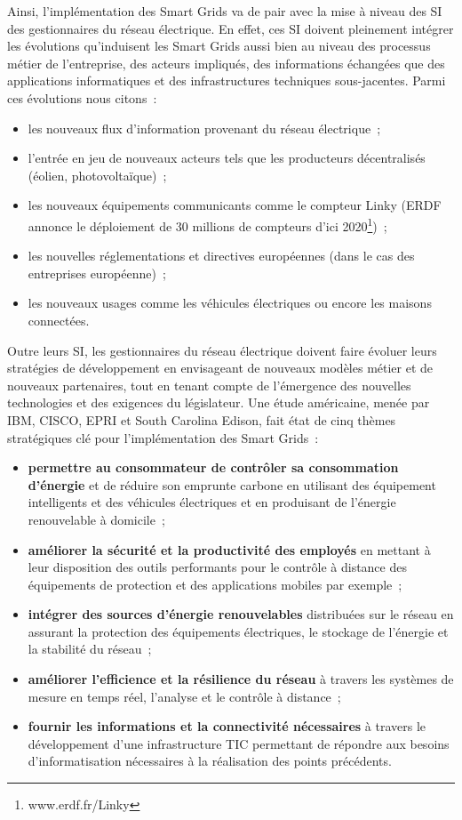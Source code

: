 Ainsi, l'implémentation des Smart Grids va de pair avec la mise à niveau des SI des gestionnaires du réseau électrique. En effet, ces SI doivent pleinement intégrer les évolutions qu'induisent les Smart Grids aussi bien au niveau des processus métier de l'entreprise, des acteurs impliqués, des informations échangées que des applications informatiques et des infrastructures techniques sous-jacentes. Parmi ces évolutions nous citons~:
\begin{itemize}
\item les nouveaux flux d'information provenant du réseau électrique~;
\item l'entrée en jeu de nouveaux acteurs tels que les producteurs décentralisés (éolien, photovoltaïque)~;
\item les nouveaux équipements communicants comme le compteur Linky (ERDF annonce le déploiement de 30 millions de compteurs d'ici 2020\footnote{www.erdf.fr/Linky})~;
\item les nouvelles réglementations et directives européennes (dans le cas des entreprises européenne)~;
\item les nouveaux usages comme les véhicules électriques ou encore les maisons connectées.
\end{itemize}

Outre leurs SI, les gestionnaires du réseau électrique doivent faire évoluer leurs stratégies de développement en envisageant de nouveaux modèles métier et de nouveaux partenaires, tout en tenant compte de l'émergence des nouvelles technologies et des exigences du législateur. Une étude américaine, menée par IBM, CISCO, EPRI et South Carolina Edison, fait état de cinq thèmes stratégiques clé pour l'implémentation des Smart Grids~:
\begin{itemize}
\item \textbf{permettre au consommateur de contrôler sa consommation d'énergie} et de réduire son emprunte carbone en utilisant des équipement intelligents et des véhicules électriques et en produisant de l'énergie renouvelable à domicile~;
\item \textbf{améliorer la sécurité et la productivité des employés} en mettant à leur disposition des outils performants pour le contrôle à distance des équipements de protection et des applications mobiles par exemple~;
\item \textbf{intégrer des sources d'énergie renouvelables} distribuées sur le réseau en assurant la protection des équipements électriques, le stockage de l'énergie et la stabilité du réseau~;
\item \textbf{améliorer l'efficience et la résilience du réseau} à travers les systèmes de mesure en temps réel, l'analyse et le contrôle à distance~;
\item \textbf{fournir les informations et la connectivité nécessaires} à travers le développement d'une infrastructure TIC permettant de répondre aux besoins d'informatisation nécessaires à la réalisation des points précédents.
\end{itemize}

